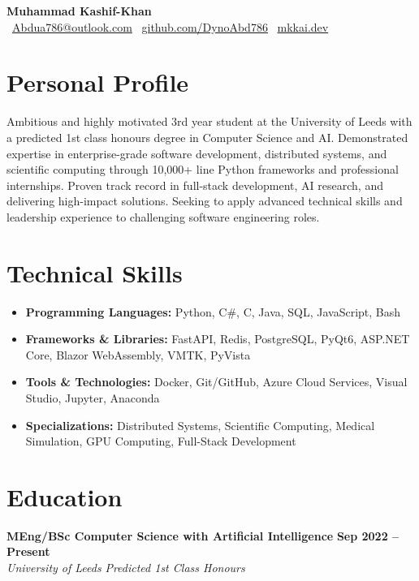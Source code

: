 \documentclass[a4paper,11pt]{article}
\begin{document}
\begin{center}
    {\Huge\bfseries Muhammad Kashif-Khan}\\[0.2cm]
    \faEnvelope\ \href{mailto:Abdua786@outlook.com}{Abdua786@outlook.com} \quad
    \faGithub\ \href{https://github.com/DynoAbd786}{github.com/DynoAbd786} \quad
    \faGlobe\ \href{https://www.mkkai.dev}{mkkai.dev}
\end{center}

\vspace{0.2cm}

\section{Personal Profile}
Ambitious and highly motivated 3rd year student at the University of Leeds with a predicted 1st class honours degree in Computer Science and AI. Demonstrated expertise in enterprise-grade software development, distributed systems, and scientific computing through 10,000+ line Python frameworks and professional internships. Proven track record in full-stack development, AI research, and delivering high-impact solutions. Seeking to apply advanced technical skills and leadership experience to challenging software engineering roles.

\section{Technical Skills}
\begin{itemize}[leftmargin=1em, itemsep=0.05em]
    \item \textbf{Programming Languages:} Python, C\#, C, Java, SQL, JavaScript, Bash
    \item \textbf{Frameworks \& Libraries:} FastAPI, Redis, PostgreSQL, PyQt6, ASP.NET Core, Blazor WebAssembly, VMTK, PyVista
    \item \textbf{Tools \& Technologies:} Docker, Git/GitHub, Azure Cloud Services, Visual Studio, Jupyter, Anaconda
    \item \textbf{Specializations:} Distributed Systems, Scientific Computing, Medical Simulation, GPU Computing, Full-Stack Development
\end{itemize}

\section{Education}
\textbf{MEng/BSc Computer Science with Artificial Intelligence} \hfill \textbf{Sep 2022 -- Present}\\
\textit{University of Leeds} \hfill \textit{Predicted 1st Class Honours}
\end{document}
